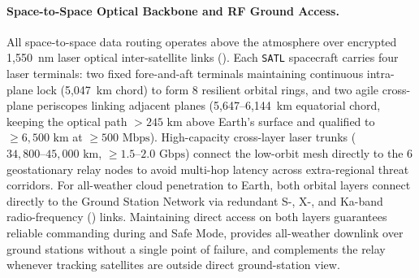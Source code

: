 \paragraph{Space-to-Space Optical Backbone and RF Ground Access.}
All space-to-space data routing operates above the atmosphere over encrypted 1,550~nm laser optical inter-satellite links (). Each \texttt{SATL} spacecraft carries four laser terminals: two fixed fore-and-aft terminals maintaining continuous intra-plane lock (5,047~km chord) to form 8 resilient orbital rings, and two agile cross-plane periscopes linking adjacent planes (5,647--6,144~km equatorial chord, keeping the optical path $> 245\text{ km}$ above Earth's surface and qualified to $\ge 6{,}500\text{ km}$ at $\ge 500\text{ Mbps}$). High-capacity cross-layer laser trunks ($34{,}800\text{--}45{,}000\text{ km}$, $\ge 1.5\text{--}2.0\text{ Gbps}$) connect the low-orbit mesh directly to the 6 geostationary relay nodes to avoid multi-hop latency across extra-regional threat corridors. For all-weather cloud penetration to Earth, both orbital layers connect directly to the Ground Station Network via redundant S-, X-, and Ka-band radio-frequency () links. Maintaining direct  access on both layers guarantees reliable commanding during  and Safe Mode, provides all-weather downlink over ground stations without a single point of failure, and complements the  relay whenever tracking satellites are outside direct ground-station view.

